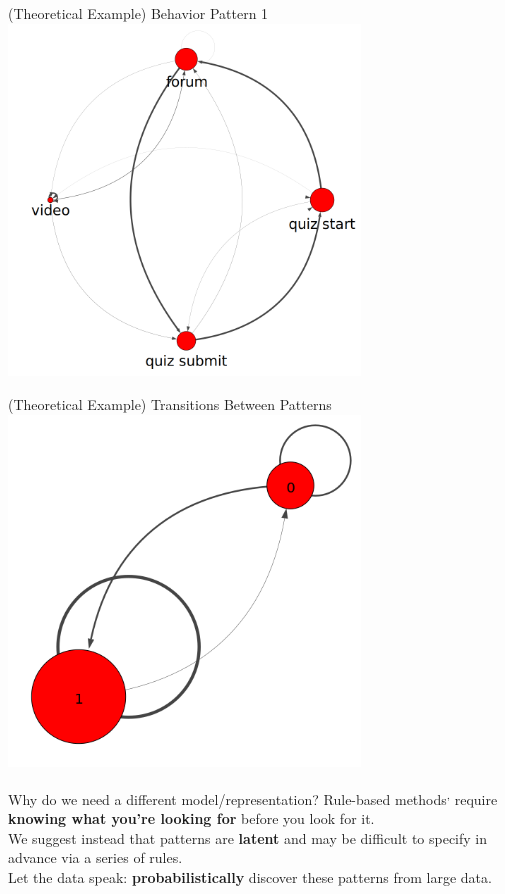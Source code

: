 \documentclass[10pt]{beamer}
\begin{document}
\begin{frame}{(Theoretical Example) Behavior Pattern 1}
  \centering
  \includegraphics[width=0.7\textwidth]{../figures/example/state1.png}
\end{frame}

\begin{frame}{(Theoretical Example) Transitions Between Patterns}
  \centering
  \includegraphics[width=0.7\textwidth]{../figures/example/trans.png}
\end{frame}

\begin{frame}{Why do we need a different model/representation?}
    Rule-based
    methods\textsuperscript{,}
    require \textbf{knowing what you're looking for} before you look for
    it.
    \\[\baselineskip]
    We suggest instead that patterns are \textbf{latent} and may be
    difficult to specify in advance via a series of rules.
    \\[\baselineskip]
    Let the data speak: \textbf{probabilistically} discover these patterns
    from large data.
\end{frame}
\end{document}
